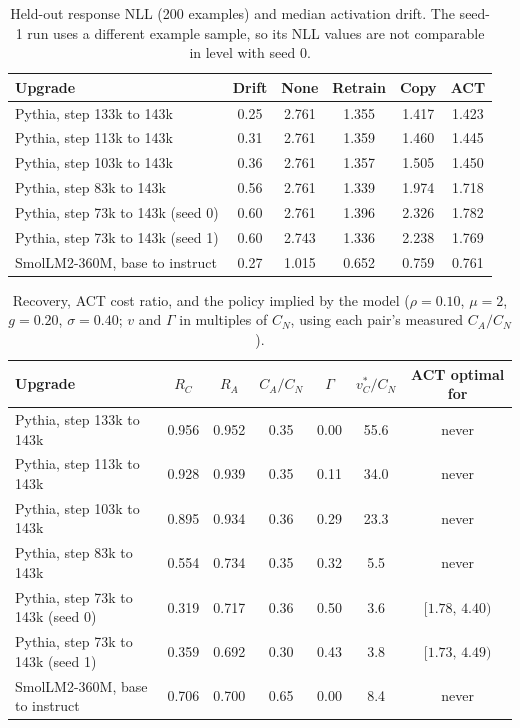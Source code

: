 \documentclass[preprint,12pt,authoryear]{elsarticle}
\begin{document}
\begin{table}[t]
\centering
\caption{Held-out response NLL (200 examples) and median activation drift. The seed-1 run uses a different example sample, so its NLL values are not comparable in level with seed 0.}\label{tab:nll}
\begin{tabular}{lccccc}
\toprule
Upgrade & Drift & None & Retrain & Copy & ACT\\
\midrule
Pythia, step 133k to 143k & 0.25 & 2.761 & 1.355 & 1.417 & 1.423\\
Pythia, step 113k to 143k & 0.31 & 2.761 & 1.359 & 1.460 & 1.445\\
Pythia, step 103k to 143k & 0.36 & 2.761 & 1.357 & 1.505 & 1.450\\
Pythia, step 83k to 143k & 0.56 & 2.761 & 1.339 & 1.974 & 1.718\\
Pythia, step 73k to 143k (seed 0) & 0.60 & 2.761 & 1.396 & 2.326 & 1.782\\
Pythia, step 73k to 143k (seed 1) & 0.60 & 2.743 & 1.336 & 2.238 & 1.769\\
SmolLM2-360M, base to instruct & 0.27 & 1.015 & 0.652 & 0.759 & 0.761\\
\bottomrule
\end{tabular}
\end{table}

\begin{table}[t]
\centering
\caption{Recovery, ACT cost ratio, and the policy implied by the model ($\rho=0.10$, $\mu=2$, $g=0.20$, $\sigma=0.40$; $v$ and $\Gamma$ in multiples of $C_N$, using each pair's measured $C_A/C_N$).}\label{tab:pairs}
\begin{tabular}{lcccccc}
\toprule
Upgrade & $R_C$ & $R_A$ & $C_A/C_N$ & $\Gamma$ & $v^*_C/C_N$ & ACT optimal for\\
\midrule
Pythia, step 133k to 143k & 0.956 & 0.952 & 0.35 & 0.00 & 55.6 & never\\
Pythia, step 113k to 143k & 0.928 & 0.939 & 0.35 & 0.11 & 34.0 & never\\
Pythia, step 103k to 143k & 0.895 & 0.934 & 0.36 & 0.29 & 23.3 & never\\
Pythia, step 83k to 143k & 0.554 & 0.734 & 0.35 & 0.32 & 5.5 & never\\
Pythia, step 73k to 143k (seed 0) & 0.319 & 0.717 & 0.36 & 0.50 & 3.6 & $[1.78,\,4.40)$\\
Pythia, step 73k to 143k (seed 1) & 0.359 & 0.692 & 0.30 & 0.43 & 3.8 & $[1.73,\,4.49)$\\
SmolLM2-360M, base to instruct & 0.706 & 0.700 & 0.65 & 0.00 & 8.4 & never\\
\bottomrule
\end{tabular}
\end{table}
\end{document}
